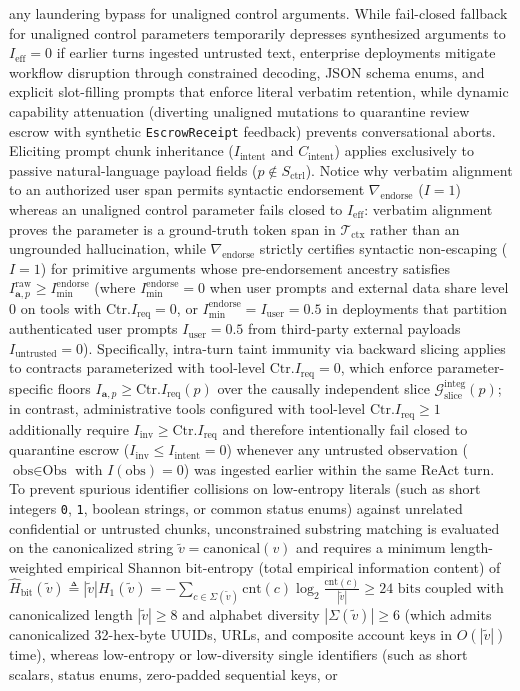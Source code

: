 \documentclass[conference,10pt]{IEEEtran}
\begin{document}
any laundering bypass for unaligned control arguments. While fail-closed fallback for unaligned control parameters temporarily depresses synthesized arguments to $I_{\text{eff}} = 0$ if earlier turns ingested untrusted text, enterprise deployments mitigate workflow disruption through constrained decoding, JSON schema enums, and explicit slot-filling prompts that enforce literal verbatim retention, while dynamic capability attenuation (diverting unaligned mutations to quarantine review escrow with synthetic \texttt{EscrowReceipt} feedback) prevents conversational aborts. Eliciting prompt chunk inheritance ($I_{\text{intent}}$ and $C_{\text{intent}}$) applies exclusively to passive natural-language payload fields ($p \notin S_{\text{ctrl}}$). Notice why verbatim alignment to an authorized user span permits syntactic endorsement $\nabla_{\text{endorse}}$ ($I=1$) whereas an unaligned control parameter fails closed to $I_{\text{eff}}$: verbatim alignment proves the parameter is a ground-truth token span in $\mathcal{T}_{\text{ctx}}$ rather than an ungrounded hallucination, while $\nabla_{\text{endorse}}$ strictly certifies syntactic non-escaping ($I=1$) for primitive arguments whose pre-endorsement ancestry satisfies $I_{\mathbf{a}, p}^{\text{raw}} \ge I_{\text{min}}^{\text{endorse}}$ (where $I_{\text{min}}^{\text{endorse}} = 0$ when user prompts and external data share level $0$ on tools with $\text{Ctr}.I_{\text{req}} = 0$, or $I_{\text{min}}^{\text{endorse}} = I_{\text{user}} = 0.5$ in deployments that partition authenticated user prompts $I_{\text{user}} = 0.5$ from third-party external payloads $I_{\text{untrusted}} = 0$). Specifically, intra-turn taint immunity via backward slicing applies to contracts parameterized with tool-level $\text{Ctr}.I_{\text{req}} = 0$, which enforce parameter-specific floors $I_{\mathbf{a}, p} \ge \text{Ctr}.I_{\text{req}}(p)$ over the causally independent slice $\mathcal{G}_{\text{slice}}^{\text{integ}}(p)$; in contrast, administrative tools configured with tool-level $\text{Ctr}.I_{\text{req}} \ge 1$ additionally require $I_{\text{inv}} \ge \text{Ctr}.I_{\text{req}}$ and therefore intentionally fail closed to quarantine escrow ($I_{\text{inv}} \le I_{\text{intent}} = 0$) whenever any untrusted observation ($\text{obs} \in \text{Obs}$ with $I(\text{obs}) = 0$) was ingested earlier within the same ReAct turn. To prevent spurious identifier collisions on low-entropy literals (such as short integers \texttt{0}, \texttt{1}, boolean strings, or common status enums) against unrelated confidential or untrusted chunks, unconstrained substring matching is evaluated on the canonicalized string $\tilde{v} = \text{canonical}(v)$ and requires a minimum length-weighted empirical Shannon bit-entropy (total empirical information content) of $\hat{H}_{\text{bit}}(\tilde{v}) \triangleq |\tilde{v}| H_1(\tilde{v}) = -\sum_{c \in \Sigma(\tilde{v})} \text{cnt}(c) \log_2 \frac{\text{cnt}(c)}{|\tilde{v}|} \ge 24\text{ bits}$ coupled with canonicalized length $|\tilde{v}| \ge 8$ and alphabet diversity $|\Sigma(\tilde{v})| \ge 6$ (which admits canonicalized 32-hex-byte UUIDs, URLs, and composite account keys in $O(|\tilde{v}|)$ time), whereas low-entropy or low-diversity single identifiers (such as short scalars, status enums, zero-padded sequential keys, or 
\end{document}

